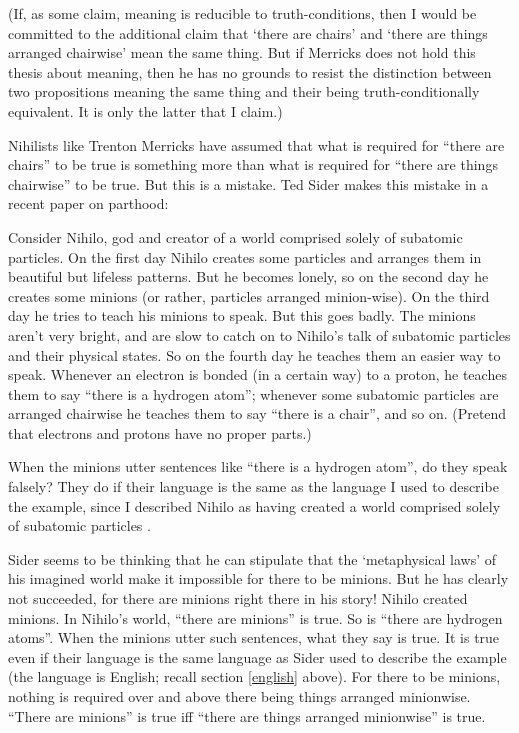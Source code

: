 \documentclass[11pt]{article}
\newenvironment{squote}{%
\begin{spacing}{1}
       	\begin{list}{}{%
\setlength{\labelwidth}{0pt}%
\rightmargin\leftmargin%
}
\item\relax
}{%
\end{list}%
\end{spacing}
}
\begin{document}
\begin{spacing}{1.25}
(If, as some claim, meaning is reducible to truth-conditions, then I
would be committed to the additional claim that `there are chairs' and
`there are things arranged chairwise' mean the same thing.  But if
Merricks does not hold this thesis about meaning, then he has no
grounds to resist the distinction between two propositions meaning the
same thing and their being truth-conditionally equivalent.  It is only
the latter that I claim.)

Nihilists like Trenton Merricks have assumed that what is required for
``there are chairs'' to be true is something more than what is
required for ``there are things chairwise'' to be true.  But this is a
mistake.  Ted Sider makes this mistake in a recent paper on parthood:

\begin{squote}
Consider Nihilo, god and creator of a world comprised solely of
subatomic particles.  On the first day Nihilo creates some particles
and arranges them in beautiful but lifeless patterns.  But he becomes
lonely, so on the second day he creates some minions (or rather,
particles arranged minion-wise).  On the third day he tries to teach
his minions to speak.  But this goes badly.  The minions aren't very
bright, and are slow to catch on to Nihilo's talk of subatomic
particles and their physical states.  So on the fourth day he teaches
them an easier way to speak.  Whenever an electron is bonded (in a
certain way) to a proton, he teaches them to say ``there is a hydrogen
atom''; whenever some subatomic particles are arranged chairwise he
teaches them to say ``there is a chair'', and so on.  (Pretend that
electrons and protons have no proper parts.)

When the minions utter sentences like ``there is a hydrogen atom'', do
they speak falsely?  They do if their language is the same as the
language I used to describe the example, since I described Nihilo as
having created a world comprised solely of subatomic particles
\citeyearpar[7]{sider2011c}.
\end{squote}

Sider seems to be thinking that he can stipulate that the
`metaphysical laws' of his imagined world make it impossible for there
to be minions.  But he has clearly not succeeded, for there are
minions right there in his story!  Nihilo created minions.  In
Nihilo's world, ``there are minions'' is true.  So is ``there are
hydrogen atoms''.  When the minions utter such sentences, what they
say is true.  It is true even if their language is the same language
as Sider used to describe the example (the language is English; recall
section \ref{english} above).  For there to be minions, nothing is
required over and above there being things arranged minionwise.
``There are minions'' is true iff ``there are things arranged
minionwise'' is true.


\end{spacing}
\end{document}
